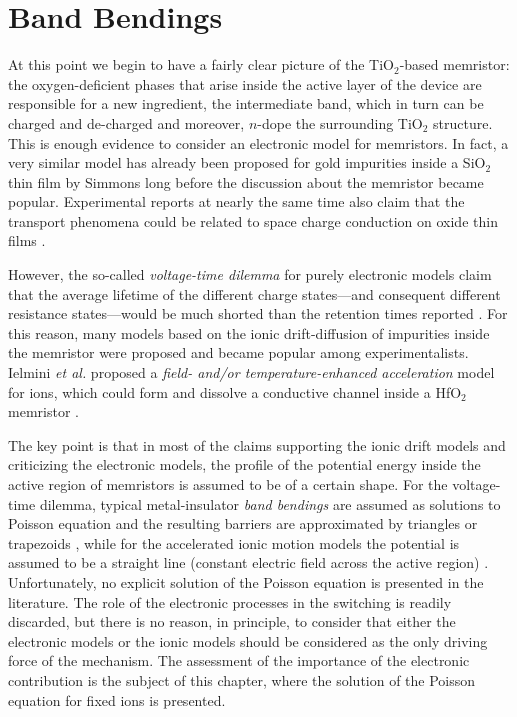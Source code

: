 \chapter{Band Bendings}
\label{chap:bandbend}

At this point we begin to have a fairly clear picture of the TiO$_2$-based memristor: the oxygen-deficient phases that arise inside the active layer of the device are responsible for a new ingredient, the intermediate band, which in turn can be charged and de-charged and moreover, $n$-dope the surrounding TiO$_2$ structure. This is enough evidence to consider an electronic model for memristors. In fact, a very similar model has already been proposed for gold impurities inside a SiO$_2$ thin film by Simmons \cite{Simmons1967} long before the discussion about the memristor became popular. Experimental reports at nearly the same time also claim that the transport phenomena could be related to space charge conduction on oxide thin films \cite{Argall1968,Chopra1965}.

However, the so-called \textit{voltage-time dilemma} for purely electronic models claim that the average lifetime of the different charge states---and consequent different resistance states---would be much shorted than the retention times reported \cite{Schroeder2010}. For this reason, many models based on the ionic drift-diffusion of impurities inside the memristor were proposed and became popular among experimentalists. Ielmini \textit{et al.} proposed a \textit{field- and/or temperature-enhanced acceleration} model for ions, which could form and dissolve a conductive channel inside a HfO$_2$ memristor \cite{Ielmini2011,Ielmini2012}. %

The key point is that in most of the claims supporting the ionic drift models and criticizing the electronic models, the profile of the potential energy inside the active region of memristors is assumed to be of a certain shape. For the voltage-time dilemma, typical metal-insulator \textit{band bendings} are assumed as solutions to Poisson equation and the resulting barriers are approximated by triangles or trapezoids \cite{Schroeder2010}, while for the accelerated ionic motion models the potential is assumed to be a straight line (constant electric field across the active region) \cite{Ielmini2011,Ielmini2012}. Unfortunately, no explicit solution of the Poisson equation is presented in the literature. The role of the electronic processes in the switching is readily discarded, but there is no reason, in principle, to consider that either the electronic models or the ionic models should be considered as the only driving force of the mechanism. The assessment of the importance of the electronic contribution is the subject of this chapter, where the solution of the Poisson equation for fixed ions is presented.

